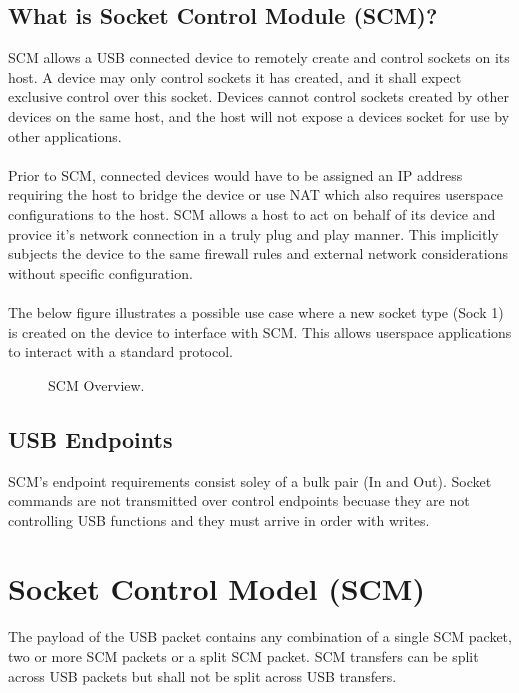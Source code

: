 \documentclass[10pt]{article}
\begin{document}
	\subsection{What is Socket Control Module (SCM)?}
	SCM allows a USB connected device to remotely create and control sockets on its host. A device may only control sockets it has created, and it shall expect exclusive control over this socket. Devices cannot control sockets created by other devices on the same host, and the host will not expose a devices socket for use by other applications.\\
	\\
	Prior to SCM, connected devices would have to be assigned an IP address requiring the host to bridge the device or use NAT which also requires userspace configurations to the host. SCM allows a host to act on behalf of its device and provice it's network connection in a truly plug and play manner. This implicitly subjects the device to the same firewall rules and external network considerations without specific configuration.\\
	\\
	The below figure illustrates a possible use case where a new socket type (Sock 1) is created on the device to interface with SCM. This allows userspace applications to interact with a standard protocol. 
	\begin{figure}[H]
		\begin{center}
			\caption[SCM Overview]{SCM Overview.}
			\scalebox{0.9}{}
		\end{center}
	\end{figure}

	\subsection{USB Endpoints}
	SCM's endpoint requirements consist soley of a bulk pair (In and Out). Socket commands are not transmitted over control endpoints becuase they are not controlling USB functions and they must arrive in order with writes.
	\section{Socket Control Model (SCM)}
	The payload of the USB packet contains any combination of a single SCM packet, 
	two or more SCM packets or a split SCM packet. SCM transfers can be split across USB packets but shall not be split across USB transfers. 
\end{document}
